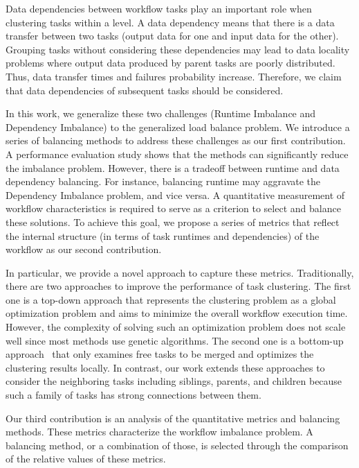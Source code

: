 \documentclass[final,5p,times,twocolumn]{elsarticle}
\begin{document}
Data dependencies between workflow tasks play an important role when clustering tasks within a level. A data dependency means that there is a data transfer between two tasks (output data for one and input data for the other). Grouping tasks without considering these dependencies may lead to data locality problems where output data produced by parent tasks are poorly distributed. Thus, data transfer times and failures probability increase.
Therefore, we claim that data dependencies of subsequent tasks should be considered.

In this work, we generalize these two challenges (Runtime Imbalance and Dependency Imbalance) to the generalized load balance problem. We introduce a series of balancing methods to address these challenges as our first contribution. A performance evaluation study shows that the methods can significantly reduce the imbalance problem.
However, there is a tradeoff between runtime and data dependency balancing. For instance, 
balancing runtime may aggravate the Dependency Imbalance problem, and vice versa. A quantitative measurement of workflow characteristics is required to serve as a criterion to select and balance these solutions. To achieve this goal, we propose a series of metrics that reflect the internal structure (in terms of task runtimes and dependencies) of the workflow as our second contribution. 

In particular, we provide a novel approach to capture these metrics. Traditionally, there are two approaches to improve the performance of task clustering. The first one is a top-down approach \cite{6217508} that represents the clustering problem as a global optimization problem and aims to minimize the overall workflow execution time. However, the complexity of solving such an optimization problem does not scale well since most methods use genetic algorithms. The second one is a bottom-up approach~\cite{Muthuvelu:2005:DJG:1082290.1082297,4958835} that only examines free tasks to be merged and optimizes the clustering results locally. In contrast, our work extends these approaches to consider the neighboring tasks including siblings, parents, and children because such a family of tasks has strong connections between them. 

Our third contribution is an analysis of the quantitative metrics and balancing methods. These metrics characterize the workflow imbalance problem. A balancing method, or a combination of those, is selected through the comparison of the relative values of these metrics.
\end{document}
